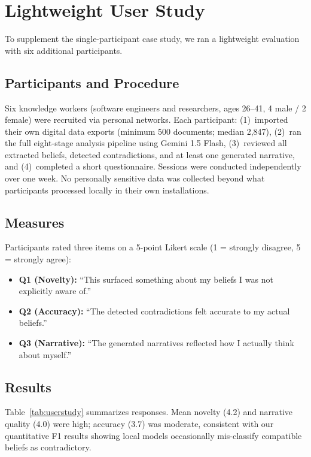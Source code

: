 \documentclass[conference]{IEEEtran}
\begin{document}
\section{Lightweight User Study}
\label{sec:userstudy}

To supplement the single-participant case study, we ran a lightweight evaluation with six additional participants.

\subsection{Participants and Procedure}

Six knowledge workers (software engineers and researchers, ages 26--41, 4 male / 2 female) were recruited via personal networks. Each participant: (1)~imported their own digital data exports (minimum 500 documents; median 2,847), (2)~ran the full eight-stage analysis pipeline using Gemini 1.5 Flash, (3)~reviewed all extracted beliefs, detected contradictions, and at least one generated narrative, and (4)~completed a short questionnaire. Sessions were conducted independently over one week. No personally sensitive data was collected beyond what participants processed locally in their own installations.

\subsection{Measures}

Participants rated three items on a 5-point Likert scale (1 = strongly disagree, 5 = strongly agree):

\begin{itemize}
  \item \textbf{Q1 (Novelty):} ``This surfaced something about my beliefs I was not explicitly aware of.''
  \item \textbf{Q2 (Accuracy):} ``The detected contradictions felt accurate to my actual beliefs.''
  \item \textbf{Q3 (Narrative):} ``The generated narratives reflected how I actually think about myself.''
\end{itemize}

\subsection{Results}

Table~\ref{tab:userstudy} summarizes responses. Mean novelty (4.2) and narrative quality (4.0) were high; accuracy (3.7) was moderate, consistent with our quantitative F1 results showing local models occasionally mis-classify compatible beliefs as contradictory.
\end{document}
